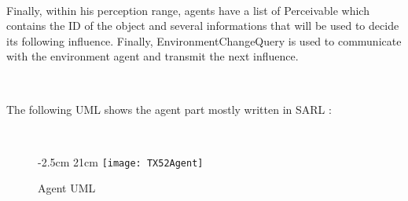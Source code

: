 \documentclass[a4paper,10pt]{book}
\begin{document}
~

Finally, within his perception range, agents have a list of Perceivable which contains the ID of the object and several informations that
will be used to decide its following influence. Finally, EnvironmentChangeQuery is used to communicate with the environment agent and transmit
the next influence.

~

The following UML shows the agent part mostly written in SARL :

~

\begin{figure}[!h]
  -2.5cm 21cm
 \centering
 \texttt{[image: TX52Agent]}
 \caption{Agent UML}
\end{figure}

~
\end{document}
